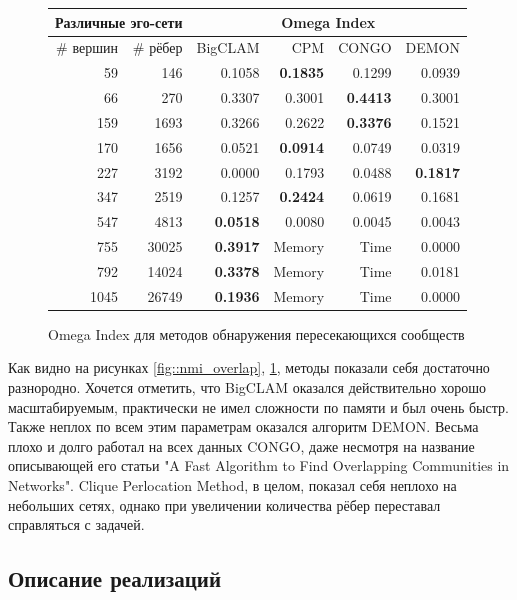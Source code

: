 \documentclass[12pt]{article}
\begin{document}
\begin{figure}[h]
\begin{center}
\begin{tabular}{rr|rrrr}
\hline
\multicolumn{2}{c|}{Различные эго-сети} & \multicolumn{4}{c}{Omega Index}\\
\hline
 \# вершин &  \# рёбер &  BigCLAM &     CPM &   CONGO &   DEMON \\
\hline
        59 &         146 &   0.1058 &  \bf{0.1835} &  0.1299 &  0.0939 \\
        66 &         270 &   0.3307 &  0.3001 &  \bf{0.4413} &  0.3001 \\
       159 &        1693 &   0.3266 &  0.2622 &  \bf{0.3376} &  0.1521 \\
       170 &        1656 &   0.0521 &  \bf{0.0914} &  0.0749 &  0.0319 \\
       227 &        3192 &   0.0000 &  0.1793 &  0.0488 &  \bf{0.1817} \\
       347 &        2519 &   0.1257 &  \bf{0.2424} &  0.0619 &  0.1681 \\
       547 &        4813 &   \bf{0.0518} &  0.0080 &  0.0045 &  0.0043 \\
       755 &       30025 &   \bf{0.3917} &  Memory &  Time &  0.0000 \\
       792 &       14024 &   \bf{0.3378} &  Memory &  Time &  0.0181 \\
      1045 &       26749 &   \bf{0.1936} &  Memory &  Time &  0.0000 \\
\hline
\end{tabular}
\caption{Omega Index для методов обнаружения пересекающихся сообществ \label{fig::omega_overlap}}
\end{center}
\end{figure}

Как видно на рисунках \ref{fig::nmi_overlap}, \ref{fig::omega_overlap}, методы показали себя достаточно разнородно. Хочется отметить, что BigCLAM оказался действительно хорошо масштабируемым, практически не имел сложности по памяти и был очень быстр. Также неплох по всем этим параметрам оказался алгоритм DEMON. Весьма плохо и долго работал на всех данных CONGO, даже несмотря на название описывающей его статьи "A Fast Algorithm to Find Overlapping Communities in Networks". Clique Perlocation Method, в целом, показал себя неплохо на небольших сетях, однако при увеличении количества рёбер переставал справляться с задачей.

\subsection{Описание реализаций}
\end{document}
